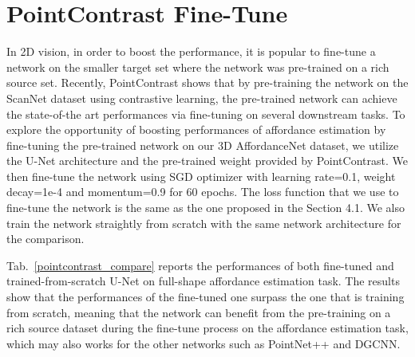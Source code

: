 \documentclass[final]{cvpr}
\begin{document}
\section{PointContrast Fine-Tune} \label{pc finetune}

\begin{table}[!htb]
\caption{The full-shape affordance estimation performance comparison between the U-Net fine-tuned on our dataset and the U-Net trained from scratch.}
\label{pointcontrast_compare}
\end{table}

In 2D vision, in order to boost the performance, it is popular to fine-tune a network on the smaller target set where the network was pre-trained on a rich source set. Recently, PointContrast shows that by pre-training the network on the ScanNet dataset using contrastive learning, the pre-trained network can achieve the state-of-the art performances via fine-tuning on several downstream tasks. To explore the opportunity of boosting performances of affordance estimation by fine-tuning the pre-trained network on our 3D AffordanceNet dataset, we utilize the U-Net architecture and the pre-trained weight provided by PointContrast. We then fine-tune the network using SGD optimizer with learning rate=0.1, weight decay=1e-4 and momentum=0.9 for 60 epochs. The loss function that we use to fine-tune the network is the same as the one proposed in the Section 4.1. We also train the network straightly from scratch with the same network architecture for the comparison.

Tab.~\ref{pointcontrast_compare} reports the performances of both fine-tuned and trained-from-scratch U-Net on full-shape affordance estimation task. The results show that the performances of the fine-tuned one surpass the one that is training from scratch, meaning that the network can benefit from the pre-training on a rich source dataset during the fine-tune process on the affordance estimation task, which may also works for the other networks such as PointNet++ and DGCNN.
\end{document}
